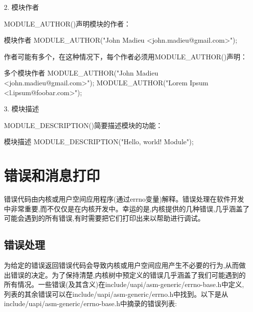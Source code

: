 \documentclass[lang=cn,newtx,10pt,scheme=chinese]{elegantbook}
\begin{document}
2. 模块作者

MODULE\_AUTHOR()声明模块的作者：

\begin{mycode}{模块作者}
MODULE_AUTHOR("John Madieu <john.madieu@gmail.com>");
\end{mycode}

作者可能有多个，在这种情况下，每个作者必须用MODULE\_AUTHOR()声明：

\begin{mycode}{多个模块作者}
MODULE_AUTHOR("John Madieu <john.madieu@gmail.com>");
MODULE_AUTHOR("Lorem Ipsum <l.ipsum@foobar.com>");
\end{mycode}

3. 模块描述

MODULE\_DESCRIPTION()简要描述模块的功能：

\begin{mycode}{模块描述}
MODULE_DESCRIPTION("Hello, world! Module");
\end{mycode}

\section{错误和消息打印}

错误代码由内核或用户空间应用程序(通过errno变量)解释。错误处理在软件开发中非常重要,而不仅仅是在内核开发中。幸运的是,内核提供的几种错误,几乎涵盖了可能会遇到的所有错误,有时需要把它们打印出来以帮助进行调试。

\subsection{错误处理}

为给定的错误返回错误代码会导致内核或用户空间应用产生不必要的行为,从而做出错误的决定。为了保持清楚,内核树中预定义的错误几乎涵盖了我们可能遇到的所有情况。一些错误(及其含义)在include/uapi/asm-generic/errno-base.h中定义,列表的其余错误可以在include/uapi/asm-generic/errno.h中找到。以下是从include/uapi/asm-generic/errno-base.h中摘录的错误列表:
\end{document}
